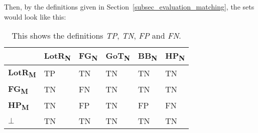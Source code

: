 Then, by the definitions given in Section~\ref{subsec_evaluation_matching}, the sets would look like this:

\begin{table}[h]
\centering
\begin{tabular}{l||l|l|l|l|l}
                       & \textbf{LotR\textsubscript{N}} & \textbf{FG\textsubscript{N}} & \textbf{GoT\textsubscript{N}} & \textbf{BB\textsubscript{N}} & \textbf{HP\textsubscript{N}} \\ \hline \hline
\textbf{LotR\textsubscript{M}}  & TP                    & TN                  & TN                   & TN                   & TN                  \\ \hline
\textbf{FG\textsubscript{M}}    & TN                    & FN                  & TN                   & TN                   & TN                  \\ \hline
\textbf{HP\textsubscript{M}}    & TN                    & FP                  & TN                   & FP                   & FN                  \\ \hline
$\mathbf{\bot}$                 & TN                    & TN                  & TN                   & TN                   & TN                  \\
\end{tabular}
\caption{This shows the definitions \emph{TP}, \emph{TN}, \emph{FP} and \emph{FN}.}
\label{tab_appendix}
\end{table}


